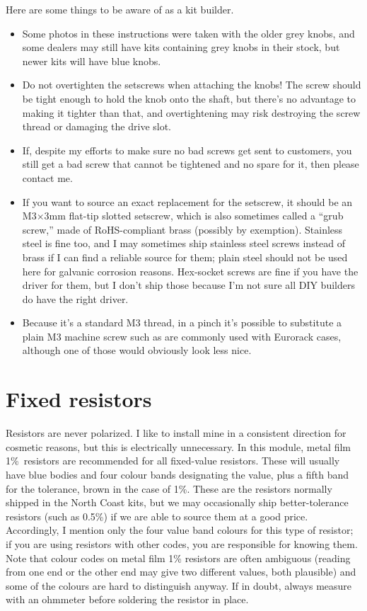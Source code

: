 Here are some things to be aware of as a kit builder.

\begin{itemize}
\item Some photos in these instructions were taken with the older grey
knobs, and some dealers may still have kits containing grey knobs in their
stock, but newer kits will have blue knobs.

\item Do not overtighten the setscrews when attaching the knobs!  The screw
should be tight enough to hold the knob onto the shaft, but there's no
advantage to making it tighter than that, and overtightening may risk
destroying the screw thread or damaging the drive slot.

\item If, despite my efforts to make sure no bad screws get sent to
customers, you still get a bad screw that cannot be tightened and no spare
for it, then please contact me.

\item If you want to source an exact replacement for the setscrew, it should
be an M3$\times$3mm flat-tip slotted setscrew, which is also sometimes
called a ``grub screw,'' made of RoHS-compliant brass (possibly by
exemption).  Stainless steel is fine too, and I may sometimes ship stainless
steel screws instead of brass if I can find a reliable source for them;
plain steel should not be used here for galvanic corrosion reasons. 
Hex-socket screws are fine if you have the driver for them, but I don't ship
those because I'm not sure all DIY builders do have the right driver.

\item Because it's a standard M3 thread, in a pinch it's possible to
substitute a plain M3 machine screw such as are commonly used with Eurorack
cases, although one of those would obviously look less nice.
\end{itemize}

\section{Fixed resistors}

Resistors are never polarized.  I like to install mine in a consistent
direction for cosmetic reasons, but this is electrically unnecessary.  In
this module, metal film 1\%\ resistors are recommended for all fixed-value
resistors.  These will usually have blue bodies and four colour bands
designating the value, plus a fifth band for the tolerance, brown in the
case of 1\%.  These are the resistors normally shipped in the
North Coast kits, but we may occasionally ship better-tolerance resistors (such
as 0.5\%) if we are able to source them at a good price. 
Accordingly, I mention only the four value band colours for this type of
resistor; if you are using resistors with other codes, you are responsible
for knowing them.  Note that colour codes on metal film 1\% resistors are
often ambiguous (reading from one end or the other end may give two
different values, both plausible) and some of the colours are hard to
distinguish anyway.  If in doubt, always measure with an ohmmeter before
soldering the resistor in place.

